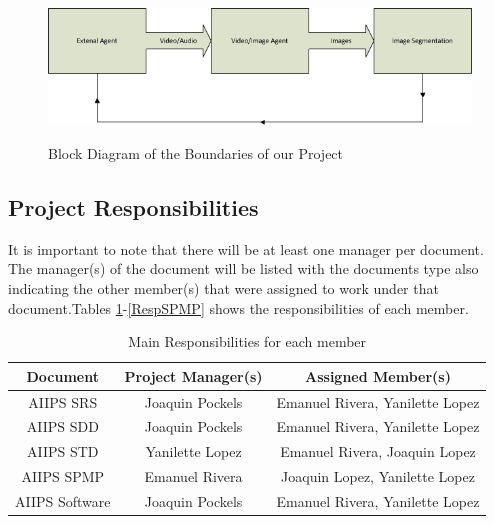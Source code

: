 \documentclass[12pt]{article}
\begin{document}
\begin{figure}[H]\centering
  \includegraphics[width=6.0in]{boundaries}\\
  \caption{Block Diagram of the Boundaries of our Project}\label{boundaries}
  \end{figure}

\subsection{Project Responsibilities}
It is important to note that there will be at least one manager per document. The manager(s) of the document will be listed with the documents type also indicating the other member(s) that were assigned to work under that document.Tables \ref{RespMem}-\ref{RespSPMP} shows the responsibilities of each member.

\begin{table}[H]\centering
\begin{tabular}{|c|c|c|}
  \hline
  Document & Project Manager(s) & Assigned Member(s) \\
   \hline
   AIIPS SRS & Joaquin Pockels & Emanuel Rivera, Yanilette Lopez \\
   \hline
   AIIPS SDD & Joaquin Pockels & Emanuel Rivera, Yanilette Lopez\\
   \hline
   AIIPS STD & Yanilette Lopez & Emanuel Rivera, Joaquin Lopez  \\
   \hline
   AIIPS SPMP & Emanuel Rivera & Joaquin Lopez, Yanilette Lopez \\
   \hline
   AIIPS Software & Joaquin Pockels & Emanuel Rivera, Yanilette Lopez \\
   \hline
\end{tabular}
\caption{Main Responsibilities for each member}
\label{RespMem}
\end{table}
\end{document}

